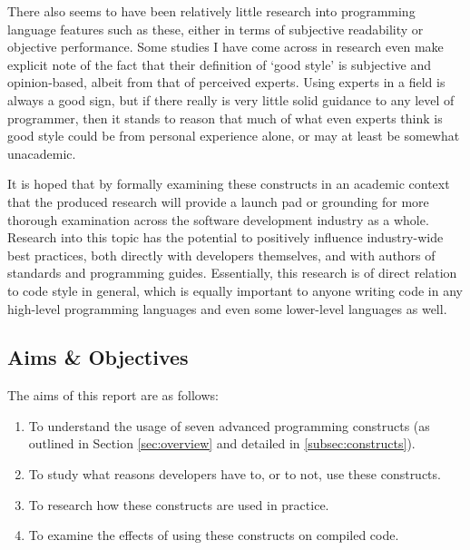 \documentclass{article}
\begin{document}
        There also seems to have been relatively little research into programming language features such as these, either in terms of subjective readability or objective performance. Some studies I have come across in research even make explicit note of the fact that their definition of `good style' is subjective and opinion-based, albeit from that of perceived experts. Using experts in a field is always a good sign, but if there really is very little solid guidance to any level of programmer, then it stands to reason that much of what even experts think is good style could be from personal experience alone, or may at least be somewhat unacademic.
        
        It is hoped that by formally examining these constructs in an academic context that the produced research will provide a launch pad or grounding for more thorough examination across the software development industry as a whole. Research into this topic has the potential to positively influence industry-wide best practices, both directly with developers themselves, and with authors of standards and programming guides. Essentially, this research is of direct relation to code style in general, which is equally important to anyone writing code in any high-level programming languages and even some lower-level languages as well.
    \subsection{Aims \& Objectives}
    \label{subsec:aimsAndObjs}
        The aims of this report are as follows:
        \begin{enumerate}
            \item To understand the usage of seven advanced programming constructs (as outlined in Section \ref{sec:overview} and detailed in \ref{subsec:constructs}).
            \item To study what reasons developers have to, or to not, use these constructs.
            \item To research how these constructs are used in practice.
            \item To examine the effects of using these constructs on compiled code.
        \end{enumerate}
        \hspace*{1cm}\newline
\end{document}
